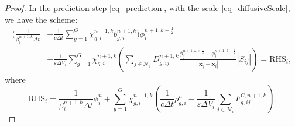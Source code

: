 \documentclass[preprint,12pt]{elsarticle}
\theoremstyle{definition}
\theoremstyle{plain}
\numberwithin{equation}{section}
\numberwithin{algorithm}{section}
\newcounter{eq_count}
\newcommand{\half}{\frac{1}{2}}
\newcommand{\vr}{\mathbf{x}}
\begin{document}
\begin{proof}
	In the prediction step \eqref{eq_prediction}, with the scale \eqref{eq_diffusiveScale}, we have the scheme:
    \begin{equation}
\begin{aligned}
    \Big(\frac{1}{\beta_i^{n+1,k} \Delta t} 
    &+ \frac{1}{c \Delta t} \sum_{g=1}^G \chi_{g,i}^{n+1, k} b_{g,i}^{n+1, k}    \Big)\phi_i^{n+1,k+\frac{1}{2}}
    \\
    &-   \frac{1}{ \varepsilon \Delta V_i } \sum_{g=1}^G \chi_{g,i}^{n+1, k} \left(  \sum_{j \in \mathcal{N}_i}   D_{g,ij}^{n+1,k}\frac{\phi_{j}^{n+1,k+\half} - \phi_i^{n+1,k+\half}}{ |\vr_j - \vr_i| }|S_{ij}|    \right)= \text{RHS}_i,
\end{aligned}
\end{equation}
where 
\begin{equation*}
    \text{RHS}_i = \frac{1}{\beta_i^{n+1,k} \Delta t}\phi_i^n +  
    \sum_{g=1}^G \chi_{g,i}^{n+1, k}  \left(\frac{1}{c \Delta t}\rho_{g,i}^n- \frac{1}{ \varepsilon \Delta  V_i } \sum_{j \in \mathcal{N}_i} F_{g,ij}^{C,n+1,k} \right).
\end{equation*}


\end{proof}
\end{document}
